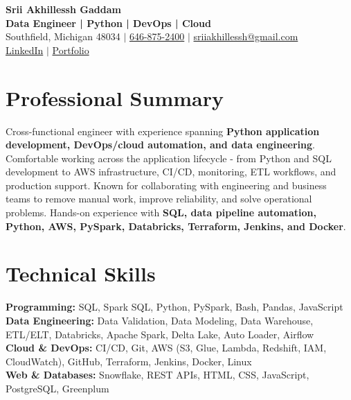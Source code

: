 \documentclass[letterpaper,10pt]{article}
\begin{document}
\fontsize{9.35pt}{10.45pt}\selectfont

\begin{center}
    {\LARGE \textbf{Srii Akhillessh Gaddam}} \\[-1pt]
    \textbf{Data Engineer | Python | DevOps | Cloud} \\[2pt]
    Southfield, Michigan 48034 $|$
    \href{tel:6468752400}{646-875-2400} $|$
    \href{mailto:sriiakhillessh@gmail.com}{sriiakhillessh@gmail.com} \\[1pt]
    \href{https://www.linkedin.com/in/srii-akhiilessh-gaddam-b48668191/}{LinkedIn} $|$
    \href{https://sriiakhillesshg.github.io/portfolio/}{Portfolio}
\end{center}
\vspace{-8pt}

\section{Professional Summary}
\small{Cross-functional engineer with experience spanning \textbf{Python application development, DevOps/cloud automation, and data engineering}. Comfortable working across the application lifecycle - from Python and SQL development to AWS infrastructure, CI/CD, monitoring, ETL workflows, and production support. Known for collaborating with engineering and business teams to remove manual work, improve reliability, and solve operational problems. Hands-on experience with \textbf{SQL, data pipeline automation, Python, AWS, PySpark, Databricks, Terraform, Jenkins, and Docker}.}

\section{Technical Skills}
\small{
\textbf{Programming:} SQL, Spark SQL, Python, PySpark, Bash, Pandas, JavaScript \\
\textbf{Data Engineering:} Data Validation, Data Modeling, Data Warehouse, ETL/ELT, Databricks, Apache Spark, Delta Lake, Auto Loader, Airflow \\
\textbf{Cloud \& DevOps:} CI/CD, Git, AWS (S3, Glue, Lambda, Redshift, IAM, CloudWatch), GitHub, Terraform, Jenkins, Docker, Linux \\
\textbf{Web \& Databases:} Snowflake, REST APIs, HTML, CSS, JavaScript, PostgreSQL, Greenplum
}
\end{document}
